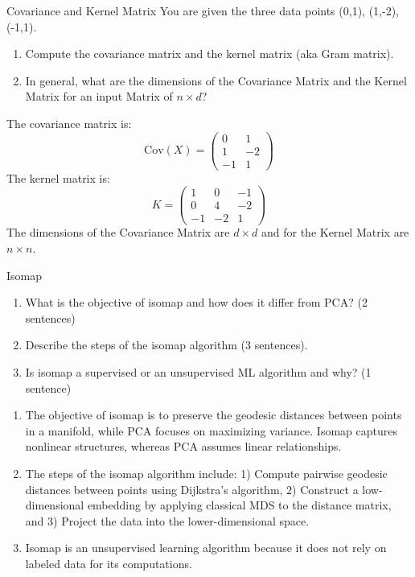 \documentclass{article}
\begin{document}
\begin{exercise}{Covariance and Kernel Matrix}
  You are given the three data points (0,1), (1,-2), (-1,1).
  \begin{enumerate}
    \item Compute the covariance matrix and the kernel matrix (aka Gram matrix).
    \item In general, what are the dimensions of the Covariance Matrix and the Kernel Matrix for an input Matrix of $n \times d$?
  \end{enumerate}

  \begin{solution}
    The covariance matrix is:
    \[
      \text{Cov}(X) = \begin{pmatrix}
        0 & 1 \\
        1 & -2 \\
        -1 & 1
      \end{pmatrix}
    \]
    The kernel matrix is:
    \[
      K = \begin{pmatrix}
        1 & 0 & -1 \\
        0 & 4 & -2 \\
        -1 & -2 & 1
      \end{pmatrix}
    \]
    The dimensions of the Covariance Matrix are $d \times d$ and for the Kernel Matrix are $n \times n$.
  \end{solution}
\end{exercise}

\begin{exercise}{Isomap}
  \begin{enumerate}
    \item What is the objective of isomap and how does it differ from PCA? (2 sentences)
    \item Describe the steps of the isomap algorithm (3 sentences).
    \item Is isomap a supervised or an unsupervised ML algorithm and why? (1 sentence)
  \end{enumerate}

  \begin{solution}
    \begin{enumerate}
      \item The objective of isomap is to preserve the geodesic distances between points in a manifold, while PCA focuses on maximizing variance. Isomap captures nonlinear structures, whereas PCA assumes linear relationships.
      \item The steps of the isomap algorithm include: 1) Compute pairwise geodesic distances between points using Dijkstra's algorithm, 2) Construct a low-dimensional embedding by applying classical MDS to the distance matrix, and 3) Project the data into the lower-dimensional space.
      \item Isomap is an unsupervised learning algorithm because it does not rely on labeled data for its computations.
    \end{enumerate}
  \end{solution}
\end{exercise}
\end{document}
